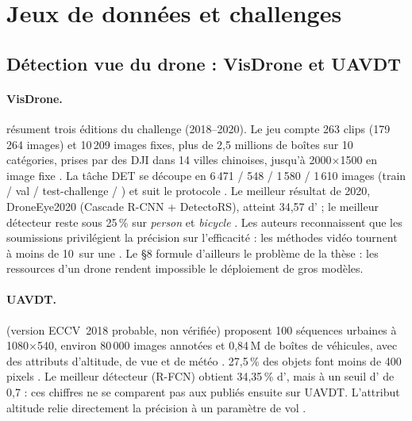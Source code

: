 \section{Jeux de données et challenges}
\label{sec:datasets}

\subsection{Détection vue du drone : VisDrone et UAVDT}

\paragraph{VisDrone.} \citet{arxiv-2001.06303-detection-tracking-meet-drones-challenge}\pp{}
résument trois éditions du challenge (2018--2020). Le jeu compte 263 clips (179\,264
images) et 10\,209 images fixes, plus de 2,5 millions de boîtes sur 10 catégories, prises
par des DJI dans 14 villes chinoises, jusqu'à 2000$\times$1500 en image fixe
. La tâche DET se découpe en 6\,471 / 548 / 1\,580 / 1\,610 images
(train / val / test-challenge / )  et suit le protocole  . Le
meilleur résultat de 2020, DroneEye2020 (Cascade R-CNN + DetectoRS), atteint 34,57 d'
 ; le meilleur détecteur reste sous 25\,\% sur \emph{person} et
\emph{bicycle} . Les auteurs reconnaissent que les soumissions privilégient la
précision sur l'efficacité : les méthodes vidéo tournent à moins de 10\, sur une  . Le §8 formule d'ailleurs le problème de la thèse : les ressources
d'un drone rendent impossible le déploiement de gros modèles.

\paragraph{UAVDT.} \citet{arxiv-1804.00518-unmanned-aerial-vehicle-benchmark-object}\pp{}
(version ECCV~2018 probable, non vérifiée) proposent 100 séquences urbaines à 1080$\times$540,
environ 80\,000 images annotées et 0,84\,M de boîtes de véhicules, avec des attributs
d'altitude, de vue et de météo . 27,5\,\% des objets font moins de 400 pixels
. Le meilleur détecteur (R-FCN) obtient 34,35\,\% d', mais à un seuil d' de
0,7  : ces chiffres ne se comparent pas aux  publiés ensuite sur UAVDT.
L'attribut altitude relie directement la précision à un paramètre de vol \deduit.

